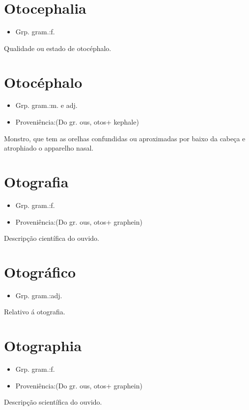 \section{Otocephalia}
\begin{itemize}
\item {Grp. gram.:f.}
\end{itemize}
Qualidade ou estado de otocéphalo.
\section{Otocéphalo}
\begin{itemize}
\item {Grp. gram.:m.  e  adj.}
\end{itemize}
\begin{itemize}
\item {Proveniência:(Do gr. \textunderscore ous\textunderscore , \textunderscore otos\textunderscore  + \textunderscore kephale\textunderscore )}
\end{itemize}
Monstro, que tem as orelhas confundidas ou aproximadas por baixo da cabeça e atrophiado o apparelho nasal.
\section{Otografia}
\begin{itemize}
\item {Grp. gram.:f.}
\end{itemize}
\begin{itemize}
\item {Proveniência:(Do gr. \textunderscore ous\textunderscore , \textunderscore otos\textunderscore  + \textunderscore graphein\textunderscore )}
\end{itemize}
Descripção científica do ouvido.
\section{Otográfico}
\begin{itemize}
\item {Grp. gram.:adj.}
\end{itemize}
Relativo á otografia.
\section{Otographia}
\begin{itemize}
\item {Grp. gram.:f.}
\end{itemize}
\begin{itemize}
\item {Proveniência:(Do gr. \textunderscore ous\textunderscore , \textunderscore otos\textunderscore  + \textunderscore graphein\textunderscore )}
\end{itemize}
Descripção scientífica do ouvido.
